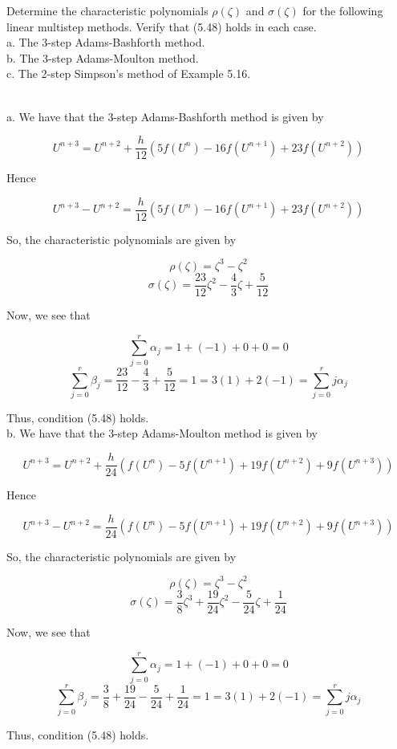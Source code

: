 Determine the characteristic polynomials $\rho(\zeta)$ and $\sigma(\zeta)$ for the following
linear multistep methods. Verify that (5.48) holds in each case.\\
a. The 3-step Adams-Bashforth method.\\
b. The 3-step Adams-Moulton method.\\
c. The 2-step Simpson's method of Example 5.16.\\

\begin{solution}\renewcommand{\qedsymbol}{}\ \\
    a. We have that the 3-step Adams-Bashforth method is given by

    $$U^{n+3}=U^{n+2}+\frac{h}{12}(5f(U^n)-16f(U^{n+1})+23f(U^{n+2}))$$

    Hence

    $$U^{n+3}-U^{n+2}=\frac{h}{12}(5f(U^n)-16f(U^{n+1})+23f(U^{n+2}))$$

    So, the characteristic polynomials are given by

    $$\rho(\zeta)=\zeta^3-\zeta^2$$
    $$\sigma(\zeta)=\frac{23}{12}\zeta^2-\frac43\zeta+\frac{5}{12}$$

    Now, we see that

    $$\sum_{j=0}^r\alpha_j=1+(-1)+0+0=0$$
    $$\sum_{j=0}^r\beta_j=\frac{23}{12}-\frac43+\frac{5}{12}=1=3(1)+2(-1)=\sum_{j=0}^rj\alpha_j$$

    Thus, condition (5.48) holds.\\

    b. We have that the 3-step Adams-Moulton method is given by

    $$U^{n+3}=U^{n+2}+\frac{h}{24}(f(U^n)-5f(U^{n+1})+19f(U^{n+2})+9f(U^{n+3}))$$

    Hence

    $$U^{n+3}-U^{n+2}=\frac{h}{24}(f(U^n)-5f(U^{n+1})+19f(U^{n+2})+9f(U^{n+3}))$$
    
    So, the characteristic polynomials are given by

    $$\rho(\zeta)=\zeta^3-\zeta^2$$
    $$\sigma(\zeta)=\frac38\zeta^3+\frac{19}{24}\zeta^2-\frac{5}{24}\zeta+\frac{1}{24}$$

    Now, we see that

    $$\sum_{j=0}^r\alpha_j=1+(-1)+0+0=0$$
    $$\sum_{j=0}^r\beta_j=\frac{3}{8}+\frac{19}{24}-\frac{5}{24}+\frac{1}{24}=1=3(1)+2(-1)=
    \sum_{j=0}^rj\alpha_j$$

    Thus, condition (5.48) holds.\\


\end{solution}
